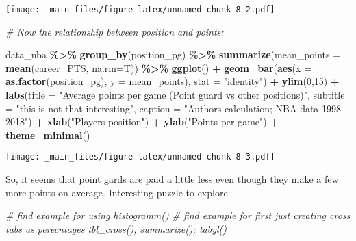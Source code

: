 \documentclass[
]{book}
\newenvironment{Shaded}{\begin{snugshade}}{\end{snugshade}}
\newcommand{\AttributeTok}[1]{\textcolor[rgb]{0.13,0.29,0.53}{#1}}
\newcommand{\CommentTok}[1]{\textcolor[rgb]{0.56,0.35,0.01}{\textit{#1}}}
\newcommand{\DecValTok}[1]{\textcolor[rgb]{0.00,0.00,0.81}{#1}}
\newcommand{\FunctionTok}[1]{\textcolor[rgb]{0.13,0.29,0.53}{\textbf{#1}}}
\newcommand{\NormalTok}[1]{#1}
\newcommand{\SpecialCharTok}[1]{\textcolor[rgb]{0.81,0.36,0.00}{\textbf{#1}}}
\newcommand{\StringTok}[1]{\textcolor[rgb]{0.31,0.60,0.02}{#1}}
\begin{document}
\texttt{[image: \_main\_files/figure-latex/unnamed-chunk-8-2.pdf]}

\begin{Shaded}
\begin{Highlighting}[]
\CommentTok{\# Now the relationship between position and points:}

\NormalTok{data\_nba }\SpecialCharTok{\%\textgreater{}\%} 
  \FunctionTok{group\_by}\NormalTok{(position\_pg) }\SpecialCharTok{\%\textgreater{}\%}
  \FunctionTok{summarize}\NormalTok{(}\AttributeTok{mean\_points =} \FunctionTok{mean}\NormalTok{(career\_PTS, }\AttributeTok{na.rm=}\NormalTok{T)) }\SpecialCharTok{\%\textgreater{}\%}
  \FunctionTok{ggplot}\NormalTok{() }\SpecialCharTok{+}
  \FunctionTok{geom\_bar}\NormalTok{(}\FunctionTok{aes}\NormalTok{(}\AttributeTok{x =} \FunctionTok{as.factor}\NormalTok{(position\_pg), }
               \AttributeTok{y =}\NormalTok{ mean\_points),}
           \AttributeTok{stat =} \StringTok{"identity"}\NormalTok{) }\SpecialCharTok{+} 
  \FunctionTok{ylim}\NormalTok{(}\DecValTok{0}\NormalTok{,}\DecValTok{15}\NormalTok{) }\SpecialCharTok{+}
  \FunctionTok{labs}\NormalTok{(}\AttributeTok{title =} \StringTok{"Average points per game (Point guard vs other positions)"}\NormalTok{,}
       \AttributeTok{subtitle =} \StringTok{"this is not that interesting"}\NormalTok{,}
       \AttributeTok{caption =} \StringTok{"Authors\textquotesingle{} calculation; NBA data 1998{-}2018"}\NormalTok{) }\SpecialCharTok{+}
  \FunctionTok{xlab}\NormalTok{(}\StringTok{"Player\textquotesingle{}s position"}\NormalTok{) }\SpecialCharTok{+}
  \FunctionTok{ylab}\NormalTok{(}\StringTok{"Points per game"}\NormalTok{) }\SpecialCharTok{+}
  \FunctionTok{theme\_minimal}\NormalTok{()}
\end{Highlighting}
\end{Shaded}

\texttt{[image: \_main\_files/figure-latex/unnamed-chunk-8-3.pdf]}

So, it seems that point gards are paid a little less even though they make a few more points on average. Interesting puzzle to explore.

\begin{Shaded}
\begin{Highlighting}[]
\CommentTok{\# find example for using histogramm()}
\CommentTok{\# find example for first just creating cross tabs as perecntages tbl\_cross(); summarize(); tabyl()}
\end{Highlighting}
\end{Shaded}
\end{document}
